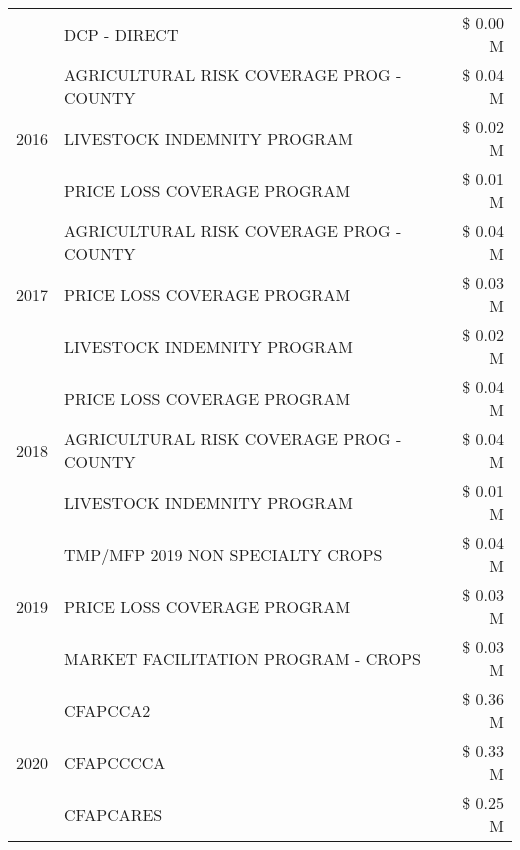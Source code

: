 \begin{tabular}{llr}
 & DCP - DIRECT & \$ 0.00 M \\
\cline{1-3}
\multirow[t]{3}{*}{2016} & AGRICULTURAL RISK COVERAGE PROG - COUNTY & \$ 0.04 M \\
 & LIVESTOCK INDEMNITY PROGRAM & \$ 0.02 M \\
 & PRICE LOSS COVERAGE PROGRAM & \$ 0.01 M \\
\cline{1-3}
\multirow[t]{3}{*}{2017} & AGRICULTURAL RISK COVERAGE PROG - COUNTY & \$ 0.04 M \\
 & PRICE LOSS COVERAGE PROGRAM & \$ 0.03 M \\
 & LIVESTOCK INDEMNITY PROGRAM & \$ 0.02 M \\
\cline{1-3}
\multirow[t]{3}{*}{2018} & PRICE LOSS COVERAGE PROGRAM & \$ 0.04 M \\
 & AGRICULTURAL RISK COVERAGE PROG - COUNTY & \$ 0.04 M \\
 & LIVESTOCK INDEMNITY PROGRAM & \$ 0.01 M \\
\cline{1-3}
\multirow[t]{3}{*}{2019} & TMP/MFP 2019 NON SPECIALTY CROPS & \$ 0.04 M \\
 & PRICE LOSS COVERAGE PROGRAM & \$ 0.03 M \\
 & MARKET FACILITATION PROGRAM - CROPS & \$ 0.03 M \\
\cline{1-3}
\multirow[t]{3}{*}{2020} & CFAPCCA2 & \$ 0.36 M \\
 & CFAPCCCCA & \$ 0.33 M \\
 & CFAPCARES & \$ 0.25 M \\
\cline{1-3}
\bottomrule
\end{tabular}
